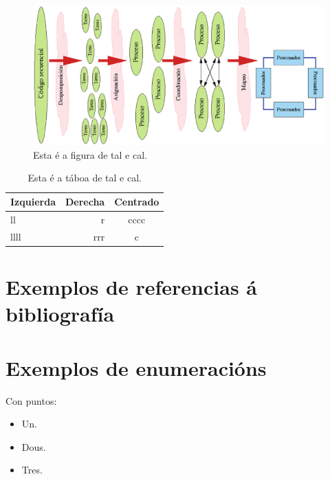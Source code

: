 \begin{figure}
\centerline{\includegraphics[width=15cm]{figuras/figura01.eps}}
\caption{Esta é a figura de tal e cal.}
\label{enlace1}
\end{figure}

\begin{table}
\begin{center}
\begin{tabular}{|l||r|c|} \hline
Izquierda & Derecha & Centrado  \\ \hline\hline
ll & r & cccc \\ \hline
llll & rrr & c \\ \hline
\end{tabular}
\caption{Esta é a táboa de tal e cal.}
\label{enlace2}
\end{center}
\end{table}

\section{Exemplos de referencias á bibliografía}

\section{Exemplos de enumeracións}

Con puntos:

\begin{itemize}
\item Un.
\item Dous.
\item Tres.
\end{itemize}

